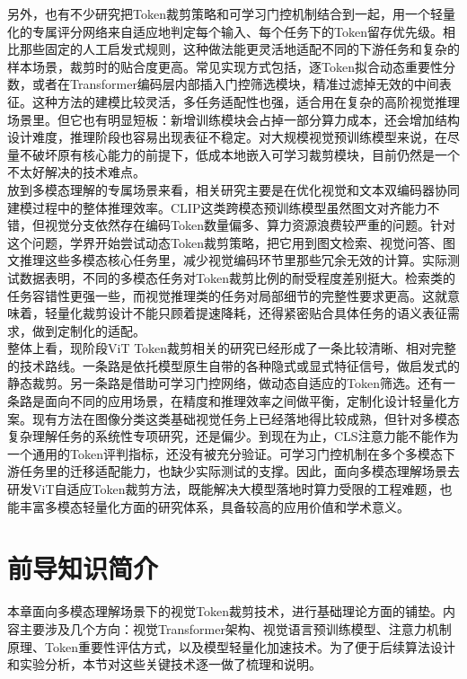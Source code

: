 \documentclass{article}
\begin{document}
{{{{{		另外，也有不少研究把Token裁剪策略和可学习门控机制结合到一起，用一个轻量化的专属评分网络来自适应地判定每个输入、每个任务下的Token留存优先级。相比那些固定的人工启发式规则，这种做法能更灵活地适配不同的下游任务和复杂的样本场景，裁剪时的贴合度更高。常见实现方式包括，逐Token拟合动态重要性分数，或者在Transformer编码层内部插入门控筛选模块，精准过滤掉无效的中间表征。这种方法的建模比较灵活，多任务适配性也强，适合用在复杂的高阶视觉推理场景里。但它也有明显短板：新增训练模块会占掉一部分算力成本，还会增加结构设计难度，推理阶段也容易出现表征不稳定。对大规模视觉预训练模型来说，在尽量不破坏原有核心能力的前提下，低成本地嵌入可学习裁剪模块，目前仍然是一个不太好解决的技术难点。\\
		放到多模态理解的专属场景来看，相关研究主要是在优化视觉和文本双编码器协同建模过程中的整体推理效率。CLIP这类跨模态预训练模型虽然图文对齐能力不错，但视觉分支依然存在编码Token数量偏多、算力资源浪费较严重的问题。针对这个问题，学界开始尝试动态Token裁剪策略，把它用到图文检索、视觉问答、图文推理这些多模态核心任务里，减少视觉编码环节里那些冗余无效的计算。实际测试数据表明，不同的多模态任务对Token裁剪比例的耐受程度差别挺大。检索类的任务容错性更强一些，而视觉推理类的任务对局部细节的完整性要求更高。这就意味着，轻量化裁剪设计不能只顾着提速降耗，还得紧密贴合具体任务的语义表征需求，做到定制化的适配。\\
		整体上看，现阶段ViT Token裁剪相关的研究已经形成了一条比较清晰、相对完整的技术路线。一条路是依托模型原生自带的各种隐式或显式特征信号，做启发式的静态裁剪。另一条路是借助可学习门控网络，做动态自适应的Token筛选。还有一条路是面向不同的应用场景，在精度和推理效率之间做平衡，定制化设计轻量化方案。现有方法在图像分类这类基础视觉任务上已经落地得比较成熟，但针对多模态复杂理解任务的系统性专项研究，还是偏少。到现在为止，CLS注意力能不能作为一个通用的Token评判指标，还没有被充分验证。可学习门控机制在多个多模态下游任务里的迁移适配能力，也缺少实际测试的支撑。因此，面向多模态理解场景去研发ViT自适应Token裁剪方法，既能解决大模型落地时算力受限的工程难题，也能丰富多模态轻量化方面的研究体系，具备较高的应用价值和学术意义。
	\section{前导知识简介}
	{\setlength{\parindent}{2em}\setlength{\baselineskip}{20pt}\selectfont
		本章面向多模态理解场景下的视觉Token裁剪技术，进行基础理论方面的铺垫。内容主要涉及几个方向：视觉Transformer架构、视觉语言预训练模型、注意力机制原理、Token重要性评估方式，以及模型轻量化加速技术。为了便于后续算法设计和实验分析，本节对这些关键技术逐一做了梳理和说明。
}}}}}}
\end{document}
